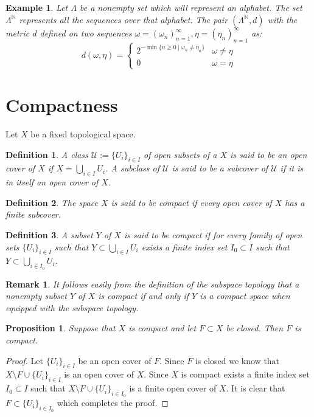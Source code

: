 \documentclass[11pt,a4paper]{article}
\theoremstyle{plain}
\newtheorem{proposition}[theorem]{Proposition}
\newtheorem{definition}{Definition}[section]
\newtheorem{remark}{Remark}[section]
\newtheorem{example}{Example}[section]
\newcommand{\N}{\mathbb{N}}
\begin{document}
	\begin{example}
	Let $\Lambda$ be a nonempty set which will represent an alphabet.
	The set $\Lambda^{\N}$ represents all the sequences over that alphabet.
	The pair $(\Lambda^\N, d)$ with the metric $d$ defined on two sequences
	$\omega = (\omega_n)_{n=1}^{\infty}, \eta = (\eta_n)_{n=1}^{\infty}$
	as:
	\[
		d(\omega, \eta) = \begin{cases}
			2^{-\min\{n \geq 0 \mid \omega_n \neq \eta_n\}} & 
			\omega \neq \eta \\
			0 & \omega = \eta
		\end{cases}
	\]
	\end{example}
	
	\newpage
	
	\section{Compactness}
	Let $X$ be a fixed topological space.
	\begin{definition}
		A class $\mathcal{U} := \{U_i\}_{i \in I}$ of open subsets of a
		$X$ is said to be an \emph{open cover of $X$} if 
		$X = \bigcup_{i \in I} U_i$. A subclass of $\mathcal{U}$ is said
		to be a subcover of $\mathcal{U}$ if it is in itself an open cover
		of $X$.
	\end{definition}
	\begin{definition}
		The space $X$ is said to be compact if every open cover of $X$
		has a finite subcover.
	\end{definition}
	\begin{definition}
		A subset $Y$ of $X$ is said to be compact if for every family of open
		sets $\{U_i\}_{i \in I}$ such that $Y \subset \bigcup_{i \in I} U_i$
		exists a finite index set $I_0 \subset I$ such that 
		$Y \subset \bigcup_{i \in I_0} U_i$.
	\end{definition}
	\begin{remark}
		It follows easily from the definition of the subspace topology that 
		a nonempty subset $Y$ of $X$ is compact if and only if $Y$ is a 
		compact space when equipped with the subspace topology.
	\end{remark}
	\begin{proposition}
		Suppose that $X$ is compact and let $F \subset X$ be closed. Then
		$F$ is compact.
	\end{proposition}
	\begin{proof}
		Let $\{U_i\}_{i \in I}$ be an open cover of $F$. Since $F$ is closed
		we know that $X \setminus F \cup \{U_i\}_{i \in I}$ is an open cover
		of $X$. Since $X$ is compact exists a finite index set $I_0 \subset I$
		such that $X \setminus F \cup \{U_i\}_{i \in I_0}$ is a finite
		open cover of $X$. It is clear that $F \subset \{U_i\}_{i \in I_0}$
		which completes the proof.
	\end{proof}
\end{document}
